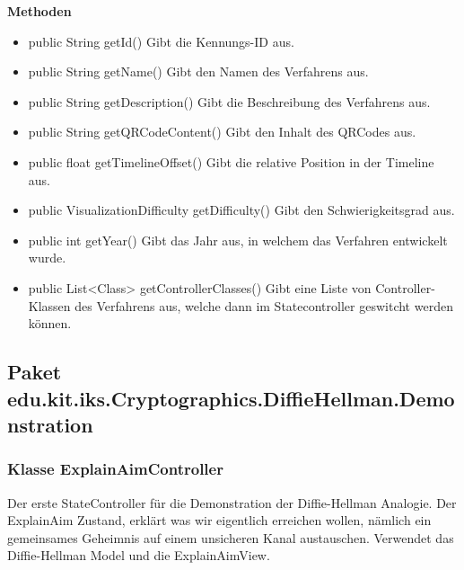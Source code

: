 \documentclass{article}
\begin{document}
      \textbf{Methoden}
      \begin{itemize}
        \item public String getId() \newline
        Gibt die Kennungs-ID aus.
        \item public String getName() \newline
        Gibt den Namen des Verfahrens aus.
        \item public String getDescription() \newline
        Gibt die Beschreibung des Verfahrens aus.
        \item public String getQRCodeContent() \newline
        Gibt den Inhalt des QRCodes aus.
        \item public float getTimelineOffset() \newline
        Gibt die relative Position in der Timeline aus.
        \item public VisualizationDifficulty getDifficulty() \newline
        Gibt den Schwierigkeitsgrad aus.
        \item public int getYear() \newline
        Gibt das Jahr aus, in welchem das Verfahren entwickelt wurde.
        \item public List<Class> getControllerClasses() \newline
        Gibt eine Liste von Controller-Klassen des Verfahrens aus, welche dann im Statecontroller geswitcht werden können.
      \end{itemize}

\subsection{Paket edu.kit.iks.Cryptographics.DiffieHellman.Demonstration}

\subsubsection{Klasse ExplainAimController}
      Der erste StateController für die Demonstration der Diffie-Hellman Analogie.
      Der ExplainAim Zustand, erklärt was wir eigentlich erreichen wollen,
      nämlich ein gemeinsames Geheimnis auf einem unsicheren Kanal austauschen.
      Verwendet das Diffie-Hellman Model und die ExplainAimView.
\end{document}

